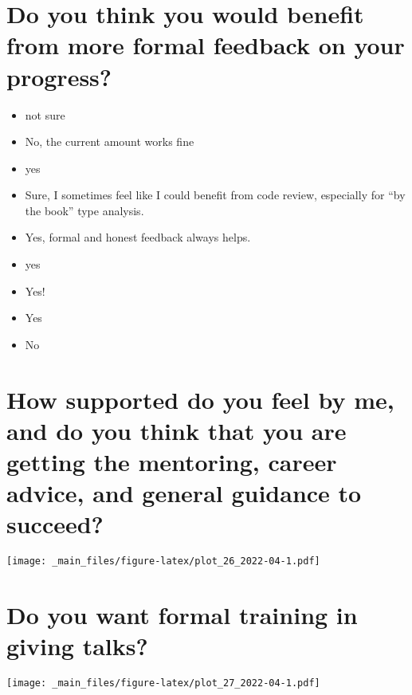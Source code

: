 \documentclass[
]{book}
\providecommand{\tightlist}{%
  \setlength{\itemsep}{0pt}\setlength{\parskip}{0pt}}
\begin{document}
\hypertarget{do-you-think-you-would-benefit-from-more-formal-feedback-on-your-progress}{%
\section{Do you think you would benefit from more formal feedback on your progress?}\label{do-you-think-you-would-benefit-from-more-formal-feedback-on-your-progress}}

\begin{itemize}
\tightlist
\item
  not sure
\item
  No, the current amount works fine
\item
  yes
\item
  Sure, I sometimes feel like I could benefit from code review, especially for ``by the book'' type analysis.
\item
  Yes, formal and honest feedback always helps.
\item
  yes
\item
  Yes!
\item
  Yes
\item
  No
\end{itemize}

\hypertarget{how-supported-do-you-feel-by-me-and-do-you-think-that-you-are-getting-the-mentoring-career-advice-and-general-guidance-to-succeed}{%
\section{How supported do you feel by me, and do you think that you are getting the mentoring, career advice, and general guidance to succeed?}\label{how-supported-do-you-feel-by-me-and-do-you-think-that-you-are-getting-the-mentoring-career-advice-and-general-guidance-to-succeed}}

\texttt{[image: \_main\_files/figure-latex/plot\_26\_2022-04-1.pdf]}

\hypertarget{do-you-want-formal-training-in-giving-talks}{%
\section{Do you want formal training in giving talks?}\label{do-you-want-formal-training-in-giving-talks}}

\texttt{[image: \_main\_files/figure-latex/plot\_27\_2022-04-1.pdf]}
\end{document}
